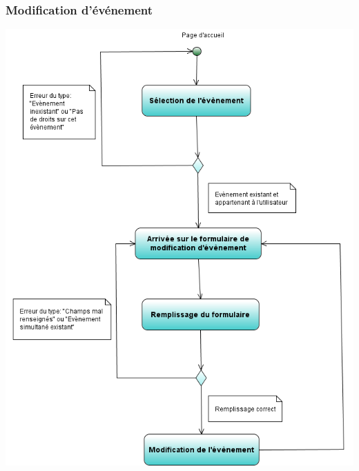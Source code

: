 \documentclass[12pt , a4paper]{article}
\begin{document}
\subsubsection{Modification d'événement}
\begin{center}
  \includegraphics[scale=0.6]{./images/diag_act_modification_evenement.png}
\end{center}
\newpage
\end{document}
